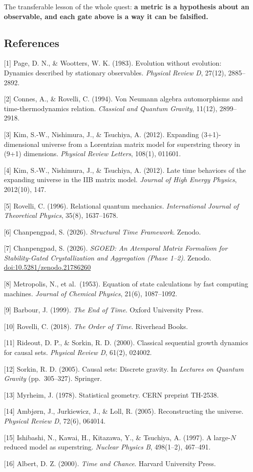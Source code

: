 The transferable lesson of the whole quest: \textbf{a metric is a
hypothesis about an observable, and each gate above is a way it can be
falsified.}

\subsection{References}\label{references}

{[}1{]} Page, D. N., \& Wootters, W. K. (1983). Evolution without
evolution: Dynamics described by stationary observables. \emph{Physical
Review D}, 27(12), 2885--2892.

{[}2{]} Connes, A., \& Rovelli, C. (1994). Von Neumann algebra
automorphisms and time-thermodynamics relation. \emph{Classical and
Quantum Gravity}, 11(12), 2899--2918.

{[}3{]} Kim, S.-W., Nishimura, J., \& Tsuchiya, A. (2012). Expanding
(3+1)-dimensional universe from a Lorentzian matrix model for
superstring theory in (9+1) dimensions. \emph{Physical Review Letters},
108(1), 011601.

{[}4{]} Kim, S.-W., Nishimura, J., \& Tsuchiya, A. (2012). Late time
behaviors of the expanding universe in the IIB matrix model.
\emph{Journal of High Energy Physics}, 2012(10), 147.

{[}5{]} Rovelli, C. (1996). Relational quantum mechanics.
\emph{International Journal of Theoretical Physics}, 35(8), 1637--1678.

{[}6{]} Chanpengpad, S. (2026). \emph{Structural Time Framework}.
Zenodo.

{[}7{]} Chanpengpad, S. (2026). \emph{SGOED: An Atemporal Matrix
Formalism for Stability-Gated Crystallization and Aggregation (Phase
1--2)}. Zenodo.
\href{https://doi.org/10.5281/zenodo.21786260}{doi:10.5281/zenodo.21786260}

{[}8{]} Metropolis, N., et al.~(1953). Equation of state calculations by
fast computing machines. \emph{Journal of Chemical Physics}, 21(6),
1087--1092.

{[}9{]} Barbour, J. (1999). \emph{The End of Time}. Oxford University
Press.

{[}10{]} Rovelli, C. (2018). \emph{The Order of Time}. Riverhead Books.

{[}11{]} Rideout, D. P., \& Sorkin, R. D. (2000). Classical sequential
growth dynamics for causal sets. \emph{Physical Review D}, 61(2),
024002.

{[}12{]} Sorkin, R. D. (2005). Causal sets: Discrete gravity. In
\emph{Lectures on Quantum Gravity} (pp.~305--327). Springer.

{[}13{]} Myrheim, J. (1978). Statistical geometry. CERN preprint
TH-2538.

{[}14{]} Ambjørn, J., Jurkiewicz, J., \& Loll, R. (2005). Reconstructing
the universe. \emph{Physical Review D}, 72(6), 064014.

{[}15{]} Ishibashi, N., Kawai, H., Kitazawa, Y., \& Tsuchiya, A. (1997).
A large-\(N\) reduced model as superstring. \emph{Nuclear Physics B},
498(1--2), 467--491.

{[}16{]} Albert, D. Z. (2000). \emph{Time and Chance}. Harvard
University Press.
